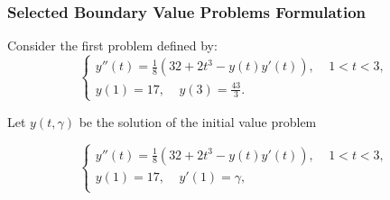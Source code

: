 \documentclass{beamer}
\begin{document}
\begin{frame}
\frametitle{Selected Boundary Value Problems Formulation} %
Consider the first problem defined by:  
\begin{equation}\label{5}
    \begin{cases}
        y''(t)=\frac{1}{8}(32+2t^3-y(t)y'(t)), \ \ \ \ \  1<t<3, \\
        y(1)=17, \ \ \ \ \ y(3)=\frac{43}{3}.
    \end{cases}
\end{equation} 

Let $y(t,\gamma)$ be the solution of the initial value problem

\begin{equation}\label{6}
    \begin{cases}
      y''(t)=\frac{1}{8}(32+2t^3-y(t)y'(t)), \ \ \ \ \ 1<t<3,\\
        y(1)=17, \ \ \ \ \ y'(1)=\gamma,\\
    \end{cases}
\end{equation}
\end{frame}
\end{document}
